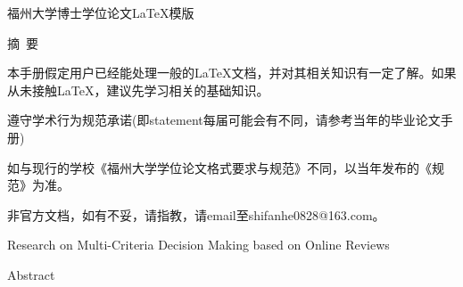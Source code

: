 \pagestyle{plain}{%
\fancyhf{} %
\fancyfoot[C]{\thepage}%
\renewcommand{\headrulewidth}{0pt}
\renewcommand{\footrulewidth}{0pt}}

\vspace{17pt}
\begin{center} 
	{\heitib \xiaoerhao
	\setlength{\baselineskip}{20pt} 
	福州大学博士学位论文\LaTeX 模版}
\vspace{30pt}
\end{center}

\begin{center}
{\heitib \sihao 摘~要}
\vspace{12pt}
\end{center}

\songti \xiaosihao
\setlength{\baselineskip}{20pt} 

本手册假定用户已经能处理一般的\LaTeX 文档，并对其相关知识有一定了解。如果从未接触\LaTeX，建议先学习相关的基础知识。

遵守学术行为规范承诺(即statement每届可能会有不同，请参考当年的毕业论文手册)

如与现行的学校《福州大学学位论文格式要求与规范》不同，以当年发布的《规范》为准。

非官方文档，如有不妥，请指教，请email至shifanhe0828@163.com。


\newpage
\begin{center} 
\vspace{17pt}
{\setmainfont{Arial Black} \xiaosanhao Research on Multi-Criteria Decision Making based on Online Reviews}
\vspace{30pt}
\end{center}

\begin{center}
{\setmainfont{Arial Black} \sihao Abstract} 
\vspace{12pt}
\end{center}

